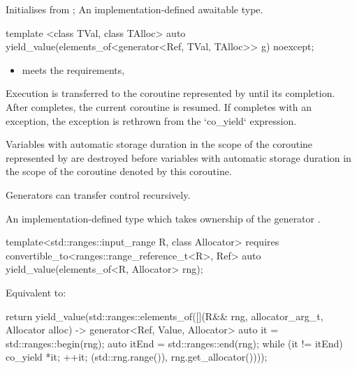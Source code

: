 \documentclass{wg21}
\begin{document}
\begin{addedblock}
\begin{itemdescr}
\effects
Initialises  from ;
\returns An implementation-defined awaitable type.

\end{itemdescr}


\begin{itemdecl}
template <class TVal, class TAlloc>
auto yield_value(elements_of<generator<Ref, TVal, TAlloc>> g) noexcept;
\end{itemdecl}

\begin{itemdescr}

\mandates
\begin{itemize}
\item {} meets the  requirements,
\end{itemize}

\effects
Execution is transferred to the coroutine represented by  until its completion.
After  completes, the current coroutine is resumed.
If  completes with an exception, the exception is rethrown from the `co_yield` expression.

Variables with automatic storage duration in the scope of the coroutine represented by  are destroyed
before variables with automatic storage duration in the scope of the coroutine denoted by this coroutine.

\begin{note}
Generators can transfer control recursively.
\end{note}

\returns An implementation-defined  type which takes ownership of the generator .

\end{itemdescr}


\begin{itemdecl}
template<std::ranges::input_range R, class Allocator>
requires convertible_to<ranges::range_reference_t<R>, Ref>
auto yield_value(elements_of<R, Allocator> rng);
\end{itemdecl}

\begin{itemdescr}
\effects
Equivalent to:
\begin{codeblock}
{
    return yield_value(std::ranges::elements_of([](R&& rng, allocator_arg_t, Allocator alloc)
    -> generator<Ref, Value, Allocator> {
        auto it = std::ranges::begin(rng);
        auto itEnd = std::ranges::end(rng);
        while (it != itEnd) {
            co_yield *it;
            ++it;
        }
    }(std::rng.range()), rng.get_allocator())));
}
\end{codeblock}


\end{itemdescr}
\end{addedblock}
\end{document}
